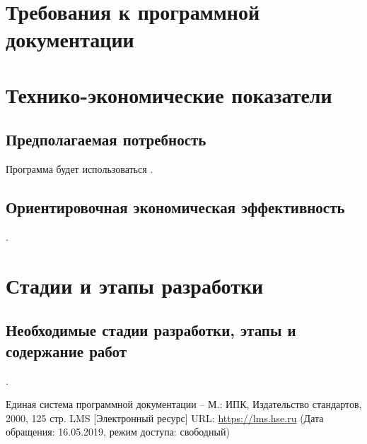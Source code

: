 \documentclass[a4paper,12pt,reqno]{article}
\begin{document}
						\newpage
	\section{Требования к программной документации}
	{\color{red}{TODO}}
	
						\newpage
	\section{Технико-экономические показатели}
	\subsection{Предполагаемая потребность}
	Программа будет использоваться {\color{red}{TODO}}.
	
	\subsection{Ориентировочная экономическая эффективность} 
	{\color{red}{TODO}}.
	
						\newpage
	\section{Стадии и этапы разработки}
	
	\subsection{Необходимые стадии разработки, этапы и содержание работ}
	{\color{red}{TODO}}
	

						\newpage
	{\color{red}{TODO}}
						\newpage
	
	 \label{interface}
	{\color{red}{TODO}}.

						\newpage
	\begin{thebibliography}{3}
		Единая система программной документации – М.: ИПК, Издательство стандартов, 2000, 125 стр.
		LMS [Электронный ресурс] URL: 
		\url{https://lms.hse.ru} (Дата обращения: 16.05.2019, режим доступа: свободный)
		
	\end{thebibliography}

						\newpage
	\listRegistration
\end{document}
